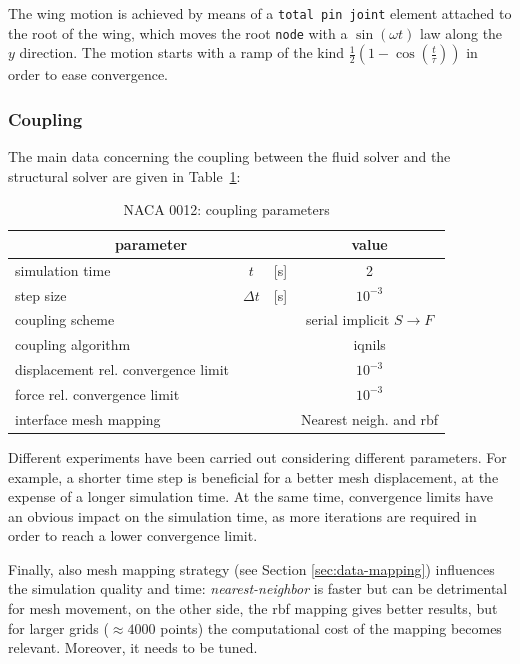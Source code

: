 The wing motion is achieved by means of a \texttt{total pin joint} element attached to the root of the wing, which moves the root \texttt{node} with a $\sin(\omega t)$ law along the $y$ direction. The motion starts with a ramp of the  kind $\frac{1}{2}\left(1-\cos\left(\frac{t}{\tau}\right)\right)$ in order to ease convergence.

\subsubsection{Coupling}

The main data concerning the coupling between the fluid solver and the structural solver  are given in Table~\ref{table:hc-coupling}:


\begin{table}[!htb]
	\begin{center}
		\begin{tabular}{ l c  l| c } 
			\multicolumn{3}{c|}{parameter} & value   \\ 
			\hline
			simulation time  & $t$& [\si{s}] & 2      \\
			step size & $\Delta t$ & [\si{s}] & $10^{-3}$   \\
			\hline
			coupling scheme & & & serial implicit  $S\rightarrow F$  \\
			coupling algorithm & & &  \acrshort{iqnils}  \\
			displacement rel. convergence limit & & & $10^{-3}$ \\
			force rel. convergence limit &&  & $10^{-3}$  \\
      		interface mesh mapping & & & Nearest neigh. and \acrshort{rbf}  \\
			
		\end{tabular}
	\end{center}
	\caption{NACA 0012: coupling parameters}
	\label{table:hc-coupling}
\end{table}

Different experiments have been carried out considering different parameters. For example, a shorter time step is beneficial for a better mesh displacement, at the expense of a longer simulation time. At the same time, convergence limits have an obvious impact on the simulation time, as more iterations are required in order to reach a lower convergence limit.

Finally, also mesh mapping strategy (see Section \ref{sec:data-mapping}) influences the simulation quality and time: \textit{nearest-neighbor} is faster but can be detrimental for mesh movement, on the other side, the \acrfull{rbf} mapping gives better results, but for larger grids ($\approx4000$ points) the computational cost of the mapping becomes relevant. Moreover, it needs to be tuned.

